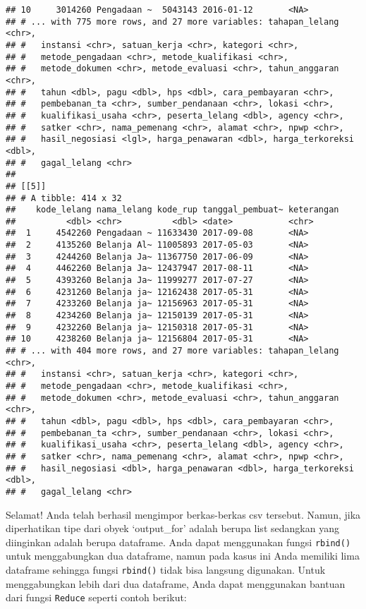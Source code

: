 \documentclass[]{article}
\begin{document}
\begin{verbatim}
## 10     3014260 Pengadaan ~  5043143 2016-01-12       <NA>      
## # ... with 775 more rows, and 27 more variables: tahapan_lelang <chr>,
## #   instansi <chr>, satuan_kerja <chr>, kategori <chr>,
## #   metode_pengadaan <chr>, metode_kualifikasi <chr>,
## #   metode_dokumen <chr>, metode_evaluasi <chr>, tahun_anggaran <chr>,
## #   tahun <dbl>, pagu <dbl>, hps <dbl>, cara_pembayaran <chr>,
## #   pembebanan_ta <chr>, sumber_pendanaan <chr>, lokasi <chr>,
## #   kualifikasi_usaha <chr>, peserta_lelang <dbl>, agency <chr>,
## #   satker <chr>, nama_pemenang <chr>, alamat <chr>, npwp <chr>,
## #   hasil_negosiasi <lgl>, harga_penawaran <dbl>, harga_terkoreksi <dbl>,
## #   gagal_lelang <chr>
## 
## [[5]]
## # A tibble: 414 x 32
##    kode_lelang nama_lelang kode_rup tanggal_pembuat~ keterangan
##          <dbl> <chr>          <dbl> <date>           <chr>     
##  1     4542260 Pengadaan ~ 11633430 2017-09-08       <NA>      
##  2     4135260 Belanja Al~ 11005893 2017-05-03       <NA>      
##  3     4244260 Belanja Ja~ 11367750 2017-06-09       <NA>      
##  4     4462260 Belanja Ja~ 12437947 2017-08-11       <NA>      
##  5     4393260 Belanja Ja~ 11999277 2017-07-27       <NA>      
##  6     4231260 Belanja ja~ 12162438 2017-05-31       <NA>      
##  7     4233260 Belanja ja~ 12156963 2017-05-31       <NA>      
##  8     4234260 Belanja ja~ 12150139 2017-05-31       <NA>      
##  9     4232260 Belanja ja~ 12150318 2017-05-31       <NA>      
## 10     4238260 Belanja ja~ 12156804 2017-05-31       <NA>      
## # ... with 404 more rows, and 27 more variables: tahapan_lelang <chr>,
## #   instansi <chr>, satuan_kerja <chr>, kategori <chr>,
## #   metode_pengadaan <chr>, metode_kualifikasi <chr>,
## #   metode_dokumen <chr>, metode_evaluasi <chr>, tahun_anggaran <chr>,
## #   tahun <dbl>, pagu <dbl>, hps <dbl>, cara_pembayaran <chr>,
## #   pembebanan_ta <chr>, sumber_pendanaan <chr>, lokasi <chr>,
## #   kualifikasi_usaha <chr>, peserta_lelang <dbl>, agency <chr>,
## #   satker <chr>, nama_pemenang <chr>, alamat <chr>, npwp <chr>,
## #   hasil_negosiasi <dbl>, harga_penawaran <dbl>, harga_terkoreksi <dbl>,
## #   gagal_lelang <chr>
\end{verbatim}

Selamat! Anda telah berhasil mengimpor berkas-berkas csv tersebut.
Namun, jika diperhatikan tipe dari obyek `output\_for' adalah berupa
list sedangkan yang diinginkan adalah berupa dataframe. Anda dapat
menggunakan fungsi \texttt{rbind()} untuk menggabungkan dua dataframe,
namun pada kasus ini Anda memiliki lima dataframe sehingga fungsi
\texttt{rbind()} tidak bisa langsung digunakan. Untuk menggabungkan
lebih dari dua dataframe, Anda dapat menggunakan bantuan dari fungsi
\texttt{Reduce} seperti contoh berikut:
\end{document}
